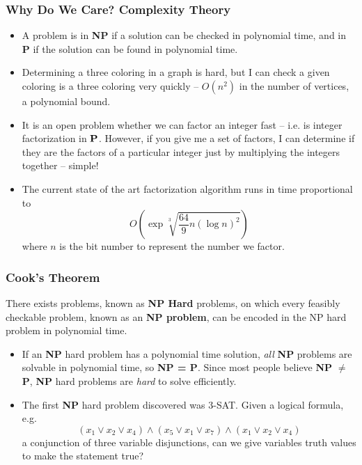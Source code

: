 \documentclass{beamer}
\begin{document}
\begin{frame}
    \frametitle{Why Do We Care? Complexity Theory}

    \begin{itemize}
        \item<1-> A problem is in {\bf NP} if a solution can be checked in polynomial time, and in {\bf P} if the solution can be found in polynomial time.

        \item<2-> Determining a three coloring in a graph is hard, but I can check a given coloring is a three coloring very quickly -- $O(n^2)$ in the number of vertices, a polynomial bound.

        \item<3-> It is an open problem whether we can factor an integer fast -- i.e. is integer factorization in ${\bf P}$. However, if you give me a set of factors, I can determine if they are the factors of a particular integer just by multiplying the integers together -- simple!

        \item<4-> The current state of the art factorization algorithm runs in time proportional to
        \[ O \left( \exp \sqrt[3]{\frac{64}{9} n (\log n)^2} \right) \]
        where $n$ is the bit number to represent the number we factor.
    \end{itemize}
\end{frame}

\begin{frame}
    \frametitle{Cook's Theorem}

    \begin{theorem}
        There exists problems, known as {\bf NP Hard} problems, on which every feasibly checkable problem, known as an {\bf NP problem}, can be encoded in the NP hard problem in polynomial time.
    \end{theorem}

    \begin{itemize}
        \item<2-> If an {\bf NP} hard problem has a polynomial time solution, {\it all} {\bf NP} problems are solvable in polynomial time, so {\bf NP = P}. Since most people believe {\bf NP} $\neq$ {\bf P}, {\bf NP} hard problems are {\it hard} to solve efficiently.

        \item<3-> The first {\bf NP} hard problem discovered was 3-SAT. Given a logical formula, e.g.
        \[ (x_1 \vee x_2 \vee x_4) \wedge (x_5 \vee x_1 \vee x_7) \wedge (x_1 \vee x_2 \vee x_4) \]
        a conjunction of three variable disjunctions, can we give variables truth values to make the statement true?
    \end{itemize}
\end{frame}
\end{document}
